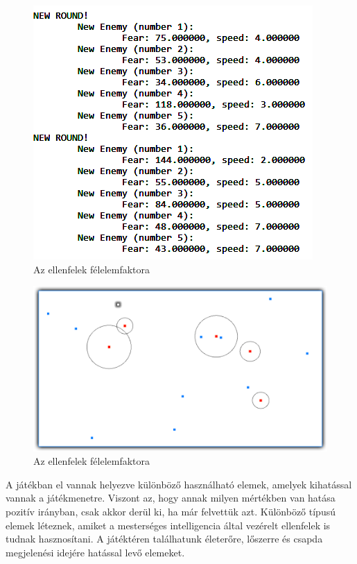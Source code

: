\begin{figure}[h]
\centering
\includegraphics[scale=0.8]{kepek/anim_random_values.png}
\caption{Az ellenfelek félelemfaktora}
\label{fig:behavior_settings}
\end{figure}

\begin{figure}[h]
\centering
\includegraphics[scale=0.42]{kepek/behavior_demo.png}
\caption{Az ellenfelek félelemfaktora}
\label{fig:behavior_demo}
\end{figure}


A játékban el vannak helyezve különböző használható elemek, amelyek kihatással vannak a játékmenetre. Viszont az, hogy annak milyen mértékben van hatása pozitív irányban, csak akkor derül ki, ha már felvettük azt. Különböző típusú elemek léteznek, amiket a mesterséges intelligencia által vezérelt ellenfelek is tudnak hasznosítani. A játéktéren találhatunk életerőre, lőszerre és csapda megjelenési idejére hatással levő elemeket.

